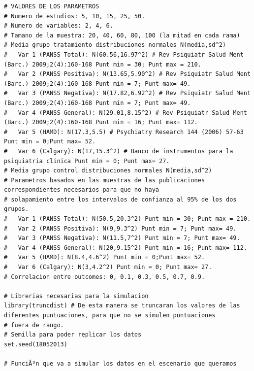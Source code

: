 \documentclass[a4paper,openright,12pt]{report}
\begin{document}
{\begin{verbatim}
# VALORES DE LOS PARAMETROS
# Numero de estudios: 5, 10, 15, 25, 50.
# Numero de variables: 2, 4, 6.
# Tamano de la muestra: 20, 40, 60, 80, 100 (la mitad en cada rama) 
# Media grupo tratamiento distribuciones normales N(media,sd^2)
#   Var 1 (PANSS Total): N(60.56,16.97^2) # Rev Psiquiatr Salud Ment (Barc.) 2009;2(4):160-168 Punt min = 30; Punt max = 210.
#   Var 2 (PANSS Positiva): N(13.65,5.90^2) # Rev Psiquiatr Salud Ment (Barc.) 2009;2(4):160-168 Punt min = 7; Punt max= 49.
#   Var 3 (PANSS Negativa): N(17.82,6.92^2) # Rev Psiquiatr Salud Ment (Barc.) 2009;2(4):160-168 Punt min = 7; Punt max= 49.
#   Var 4 (PANSS General): N(29.01,8.15^2) # Rev Psiquiatr Salud Ment (Barc.) 2009;2(4):160-168 Punt min = 16; Punt max= 112.
#   Var 5 (HAMD): N(17.3,5.5) # Psychiatry Research 144 (2006) 57-63 Punt min = 0;Punt max= 52.
#   Var 6 (Calgary): N(17,15.3^2) # Banco de instrumentos para la psiquiatria clinica Punt min = 0; Punt max= 27.
# Media grupo control distribuciones normales N(media,sd^2)
# Parametros basados en las muestras de las publicaciones correspondientes necesarios para que no haya
# solapamiento entre los intervalos de confianza al 95% de los dos grupos.
#   Var 1 (PANSS Total): N(50.5,20.3^2) Punt min = 30; Punt max = 210.
#   Var 2 (PANSS Positiva): N(9,9.3^2) Punt min = 7; Punt max= 49.
#   Var 3 (PANSS Negativa): N(11.5,7^2) Punt min = 7; Punt max= 49.
#   Var 4 (PANSS General): N(20,9.15^2) Punt min = 16; Punt max= 112.
#   Var 5 (HAMD): N(8.4,4.6^2) Punt min = 0;Punt max= 52.
#   Var 6 (Calgary): N(3,4.2^2) Punt min = 0; Punt max= 27.
# Correlacion entre outcomes: 0, 0.1, 0.3, 0.5, 0.7, 0.9. 

# Librerias necesarias para la simulacion
library(truncdist) # De esta manera se truncaran los valores de las diferentes puntuaciones, para que no se simulen puntuaciones
# fuera de rango.
# Semilla para poder replicar los datos
set.seed(18052013)

# FunciÃ³n que va a simular los datos en el escenario que queramos


\end{verbatim}}
\end{document}
